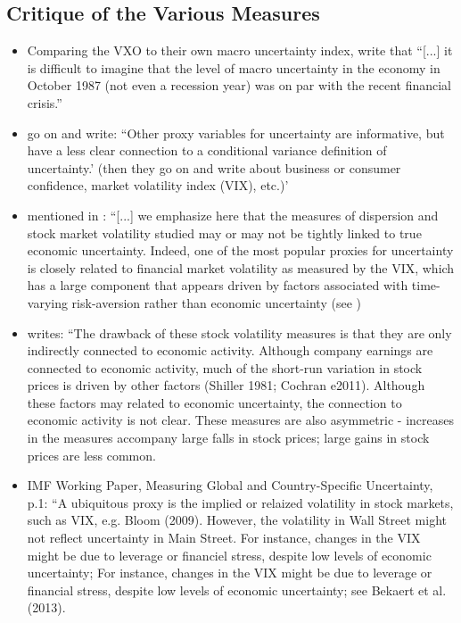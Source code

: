 \documentclass[a4paper,11pt,listof=nochaptergap,oneside,pointednumbers,bibtotoc,bigheadings,liststotoc]{scrbook}
\theoremstyle{mysatz}
\theoremstyle{mydefinition}
\theoremstyle{mybemerkung}
\begin{document}
\subsection{Critique of the Various Measures}
\begin{itemize}
	\item Comparing the VXO to their own macro uncertainty index, \citet[p. 1201]{juradoetal:15} write that ``[...] it is difficult to imagine that the level of macro uncertainty in the economy in October 1987 (not even a recession year) was on par with the recent financial crisis.''
	\item \citet{orlikandveldkamp:14} go on and write: ``Other proxy variables for uncertainty are informative, but have a less clear connection to a conditional variance definition of uncertainty.' (then they go on and write about business or consumer confidence, market volatility index (VIX), etc.)'
	\item mentioned in \citet[p. 1182]{juradoetal:15}: ``[...] we emphasize here that the measures of dispersion and stock market volatility studied may or may not be tightly linked to true economic uncertainty. Indeed, one of the most popular proxies for uncertainty is closely related to financial market volatility as measured by the VIX, which has a large component that appears driven by factors associated with time-varying risk-aversion rather than economic uncertainty (see \citet{bekaertetal:13}) 
	\item \citet[p. 4]{moore:17} writes: ``The drawback of these stock volatility measures is that they are only indirectly connected to economic activity. Although company earnings are connected to economic activity, much of the short-run variation in stock prices is driven by other factors (Shiller 1981; Cochran e2011). Although these factors may related to economic uncertainty, the connection to economic activity is not clear. These measures are also asymmetric - increases in the measures accompany large falls in stock prices; large gains in stock prices are less common.
	\item IMF Working Paper, Measuring Global and Country-Specific Uncertainty, p.1: ``A ubiquitous proxy is the implied or relaized volatility in stock markets, such as VIX, e.g. Bloom (2009). However, the volatility in Wall Street might not reflect uncertainty in Main Street. For instance, changes in the VIX might be due to leverage or financiel stress, despite low levels of economic uncertainty; For instance, changes in the VIX might be due to leverage or financial stress, despite low levels of economic uncertainty; see Bekaert et al. (2013).

\end{itemize}
\end{document}
